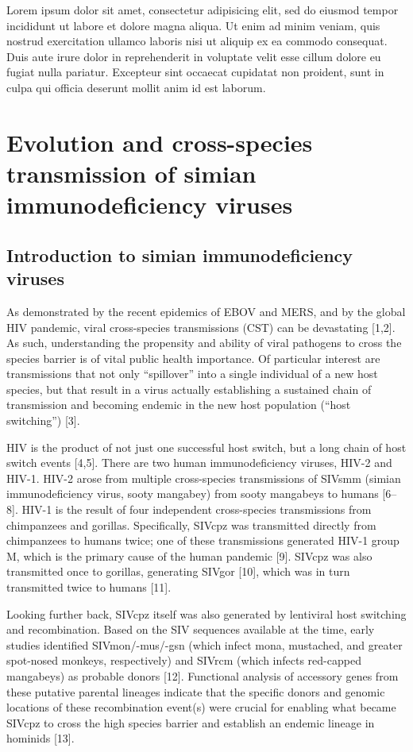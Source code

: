 Lorem ipsum dolor sit amet, consectetur adipisicing elit, sed do eiusmod tempor incididunt ut labore et dolore magna aliqua. Ut enim ad minim veniam, quis nostrud exercitation ullamco laboris nisi ut aliquip ex ea commodo consequat. Duis aute irure dolor in reprehenderit in voluptate velit esse cillum dolore eu fugiat nulla pariatur. Excepteur sint occaecat cupidatat non proident, sunt in culpa qui officia deserunt mollit anim id est laborum.


\chapter{Evolution and cross-species transmission of simian immunodeficiency viruses}

\section{Introduction to simian immunodeficiency viruses}
As demonstrated by the recent epidemics of EBOV and MERS, and by the global HIV pandemic, viral cross-species transmissions (CST) can be devastating [1,2].
As such, understanding the propensity and ability of viral pathogens to cross the species barrier is of vital public health importance.
Of particular interest are transmissions that not only “spillover” into a single individual of a new host species, but that result in a virus actually establishing a sustained chain of transmission and becoming endemic in the new host population (“host switching”) [3].

HIV is the product of not just one successful host switch, but a long chain of host switch events [4,5].
There are two human immunodeficiency viruses, HIV-2 and HIV-1.
HIV-2 arose from multiple cross-species transmissions of SIVsmm (simian immunodeficiency virus, sooty mangabey) from sooty mangabeys to humans [6–8].
HIV-1 is the result of four independent cross-species transmissions from chimpanzees and gorillas.
Specifically, SIVcpz was transmitted directly from chimpanzees to humans twice; one of these transmissions generated HIV-1 group M, which is the primary cause of the human pandemic [9].
SIVcpz was also transmitted once to gorillas, generating SIVgor [10], which was in turn transmitted twice to humans [11].

Looking further back, SIVcpz itself was also generated by lentiviral host switching and recombination.
Based on the SIV sequences available at the time, early studies identified SIVmon/-mus/-gsn (which infect mona, mustached, and greater spot-nosed monkeys, respectively) and SIVrcm (which infects red-capped mangabeys) as probable donors [12].
Functional analysis of accessory genes from these putative parental lineages indicate that the specific donors and genomic locations of these recombination event(s) were crucial for enabling what became SIVcpz to cross the high species barrier and establish an endemic lineage in hominids [13].

